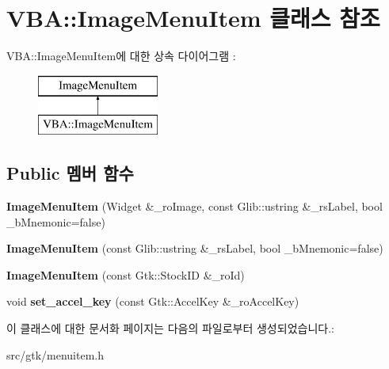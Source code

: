 \hypertarget{class_v_b_a_1_1_image_menu_item}{}\section{V\+BA\+:\+:Image\+Menu\+Item 클래스 참조}
\label{class_v_b_a_1_1_image_menu_item}
V\+BA\+:\+:Image\+Menu\+Item에 대한 상속 다이어그램 \+: \begin{figure}[H]
\begin{center}
\leavevmode
\includegraphics[height=2.000000cm]{class_v_b_a_1_1_image_menu_item}
\end{center}
\end{figure}
\subsection*{Public 멤버 함수}
\begin{DoxyCompactItemize}
\item 
\mbox{\label{class_v_b_a_1_1_image_menu_item_a52aaf1e5ccc5520a9136f113ee69c47b}} 
{\bfseries Image\+Menu\+Item} (Widget \&\+\_\+ro\+Image, const Glib\+::ustring \&\+\_\+rs\+Label, bool \+\_\+b\+Mnemonic=false)
\item 
\mbox{\label{class_v_b_a_1_1_image_menu_item_a3cc1d64f1275f7e31c6cf1d48a21c070}} 
{\bfseries Image\+Menu\+Item} (const Glib\+::ustring \&\+\_\+rs\+Label, bool \+\_\+b\+Mnemonic=false)
\item 
\mbox{\label{class_v_b_a_1_1_image_menu_item_a3b7e700a518ea938513b80817662b1d1}} 
{\bfseries Image\+Menu\+Item} (const Gtk\+::\+Stock\+ID \&\+\_\+ro\+Id)
\item 
\mbox{\label{class_v_b_a_1_1_image_menu_item_a709d7e9ac328ac7d53f576caf804398b}} 
void {\bfseries set\+\_\+accel\+\_\+key} (const Gtk\+::\+Accel\+Key \&\+\_\+ro\+Accel\+Key)
\end{DoxyCompactItemize}


이 클래스에 대한 문서화 페이지는 다음의 파일로부터 생성되었습니다.\+:\begin{DoxyCompactItemize}
\item 
src/gtk/menuitem.\+h\end{DoxyCompactItemize}
